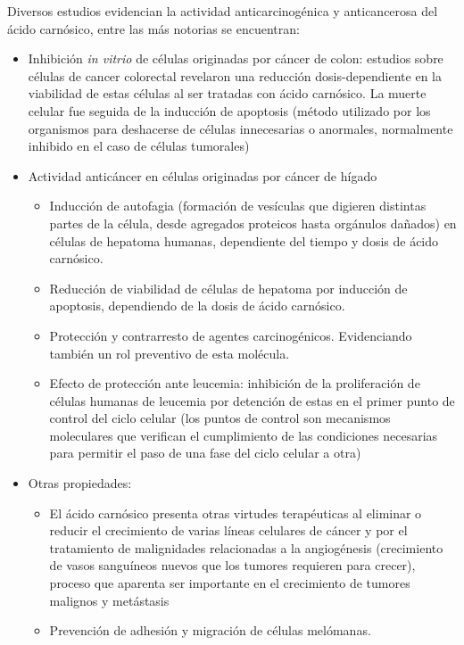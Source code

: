 \documentclass[11pt,a4paper]{article}
\begin{document}
Diversos estudios evidencian la actividad anticarcinogénica y anticancerosa del ácido carnósico, entre las más notorias se encuentran:


\begin{itemize}
	\item Inhibición \textit{in vitrio} de células originadas por cáncer de colon: estudios sobre células de cancer colorectal revelaron una reducción dosis-dependiente en la viabilidad de estas células al ser tratadas con ácido carnósico.
		La muerte celular fue seguida de la inducción de apoptosis (método utilizado por los organismos para deshacerse de células innecesarias o anormales, normalmente inhibido en el caso de células tumorales) \cite{barni_2012}

	\item Actividad anticáncer en células originadas por cáncer de hígado

		\begin{itemize}
			\item Inducción de autofagia (formación de vesículas que digieren distintas partes de la célula, desde agregados proteicos hasta orgánulos dañados) en células de hepatoma humanas, dependiente del tiempo y dosis de ácido carnósico. \cite{gao_2014}
			\item Reducción de viabilidad de células de hepatoma por inducción de apoptosis, dependiendo de la dosis de ácido carnósico. \cite{xiang_2012}
			\item Protección y contrarresto de agentes carcinogénicos. Evidenciando también un rol preventivo de esta molécula. \cite{costa_2007}
			\item Efecto de protección ante leucemia: inhibición de la proliferación de células humanas de leucemia por detención de estas en el primer punto de control del ciclo celular (los puntos de control son mecanismos moleculares que verifican el cumplimiento de las condiciones necesarias para permitir el paso de una fase del ciclo celular a otra) \cite{steiner_2001}

		\end{itemize}

	\item Otras propiedades:
		
		\begin{itemize}
			\item El ácido carnósico presenta otras virtudes terapéuticas al eliminar o reducir el crecimiento de varias líneas celulares de cáncer y por el tratamiento de malignidades relacionadas a la angiogénesis (crecimiento de vasos sanguíneos nuevos que los tumores requieren para crecer), proceso que aparenta ser importante en el crecimiento de tumores malignos y metástasis \cite{lopez_2011}
			\item Prevención de adhesión y migración de células melómanas. \cite{park_2014} 
		\end{itemize}


\end{itemize}
\end{document}
